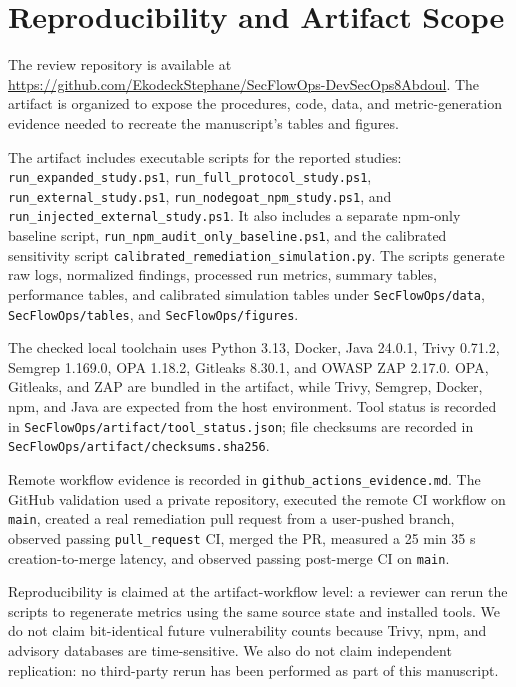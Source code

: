 \section{Reproducibility and Artifact Scope}

The review repository is available at \url{https://github.com/EkodeckStephane/SecFlowOps-DevSecOps8Abdoul}. The artifact is organized to expose the procedures, code, data, and metric-generation evidence needed to recreate the manuscript's tables and figures.

The artifact includes executable scripts for the reported studies: \texttt{run\_expanded\_study.ps1}, \texttt{run\_full\_protocol\_study.ps1}, \texttt{run\_external\_study.ps1}, \texttt{run\_nodegoat\_npm\_study.ps1}, and \texttt{run\_injected\_external\_study.ps1}. It also includes a separate npm-only baseline script, \texttt{run\_npm\_audit\_only\_baseline.ps1}, and the calibrated sensitivity script \texttt{calibrated\_remediation\_simulation.py}. The scripts generate raw logs, normalized findings, processed run metrics, summary tables, performance tables, and calibrated simulation tables under \texttt{SecFlowOps/data}, \texttt{SecFlowOps/tables}, and \texttt{SecFlowOps/figures}.

The checked local toolchain uses Python 3.13, Docker, Java 24.0.1, Trivy 0.71.2, Semgrep 1.169.0, OPA 1.18.2, Gitleaks 8.30.1, and OWASP ZAP 2.17.0. OPA, Gitleaks, and ZAP are bundled in the artifact, while Trivy, Semgrep, Docker, npm, and Java are expected from the host environment. Tool status is recorded in \texttt{SecFlowOps/artifact/tool\_status.json}; file checksums are recorded in \texttt{SecFlowOps/artifact/checksums.sha256}.

Remote workflow evidence is recorded in \texttt{github\_actions\_evidence.md}. The GitHub validation used a private repository, executed the remote CI workflow on \texttt{main}, created a real remediation pull request from a user-pushed branch, observed passing \texttt{pull\_request} CI, merged the PR, measured a 25 min 35 s creation-to-merge latency, and observed passing post-merge CI on \texttt{main}.

Reproducibility is claimed at the artifact-workflow level: a reviewer can rerun the scripts to regenerate metrics using the same source state and installed tools. We do not claim bit-identical future vulnerability counts because Trivy, npm, and advisory databases are time-sensitive. We also do not claim independent replication: no third-party rerun has been performed as part of this manuscript.

